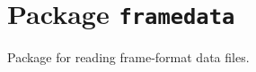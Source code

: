 \chapter{Package \texttt{framedata}}

Package for reading frame-format data files.

\newpage
\newpage
